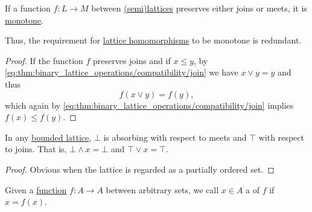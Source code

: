 \begin{corollary}\label{thm:lattice_homomorphism_is_monotone}
  If a function \( f: L \to M \) between \hyperref[def:semilattice]{(semi)lattices} preserves either joins or meets, it is \hyperref[def:partially_ordered_set/homomorphism]{monotone}.

  Thus, the requirement for \hyperref[def:semilattice/homomorphism]{lattice homomorphisms} to be monotone is redundant.
\end{corollary}
\begin{proof}
  If the function \( f \) preserves joins and if \( x \leq y \), by \eqref{eq:thm:binary_lattice_operations/compatibility/join} we have \( x \vee y = y \) and thus
  \begin{equation*}
    f(x \vee y) = f(y),
  \end{equation*}
  which again by \eqref{eq:thm:binary_lattice_operations/compatibility/join} implies \( f(x) \leq f(y) \).
\end{proof}

\begin{proposition}\label{thm:bounded_lattice_absorbing}
  In any \hyperref[def:semilattice/bounded]{bounded lattice}, \( \bot \) is absorbing with respect to meets and \( \top \) with respect to joins. That is, \( \bot \wedge x = \bot \) and \( \top \vee x = \top \).
\end{proposition}
\begin{proof}
  Obvious when the lattice is regarded as a partially ordered set.
\end{proof}

\begin{definition}\label{def:fixed_point}
  Given a \hyperref[def:function]{function} \( f: A \to A \) between arbitrary sets, we call \( x \in A \) a  of \( f \) if \( x = f(x) \).
\end{definition}

